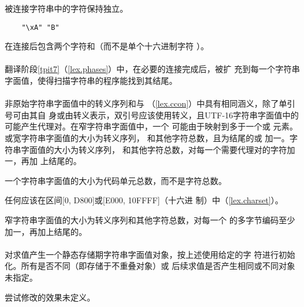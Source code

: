 被连接字符串中的字符保持独立。

\begin{example}
  \begin{lstlisting}
    "\xA" "B"
  \end{lstlisting}
  在连接后包含两个字符和（而不是单个十六进制字符
  ）。
\end{example}

\paragraph{} %
翻译阶段\ref{tpit7}（\ref{lex.phases}）中，在必要的连接完成后，被扩
充到每一个字符串字面值，使得扫描字符串的程序能找到其结尾。

\paragraph{} %
非原始字符串字面值中的转义序列和与
（\ref{lex.ccon}）中具有相同涵义，除了单引号可由其自
身或由转义表示，双引号应该使用\nt{\bs}转义，且UTF-16字符串字面值中的
可能产生代理对。在窄字符串字面值中，一个
可能由于映射到多于一个或
元素。或宽字符串字面值的大小为转义序列，
和其他字符总数，且为结尾的或
加一。字符串字面值的大小为转义序列，
和其他字符总数，对每一个需要代理对的字符加一，再加
上结尾的。

\begin{note} %
  一个字符串字面值的大小为代码单元总数，而不是字符总数。
\end{note}

\begin{note} %
  任何应该在区间[0, D800]或[E000, 10FFFF]（十六进
  制）中（\ref{lex.charset}）。
\end{note}

窄字符串字面值的大小为转义序列和其他字符总数，对每一个
的多字节编码至少加一，再加上结尾的。

\paragraph{} %
对求值产生一个静态存储期字符串字面值对象，按上述使用给定的字
符进行初始化。所有是否不同（即存储于不重叠对象）或
后续求值是否产生相同或不同对象未指定。

\begin{note} %
  尝试修改的效果未定义。
\end{note}
